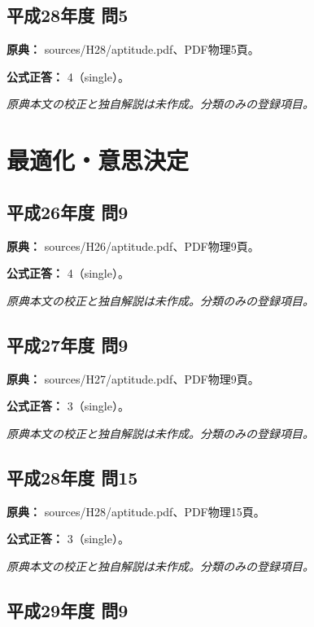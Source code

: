 \subsection{平成28年度 問5}
\label{q:h28-reg-apt-05}

\noindent\textbf{原典：} sources/H28/aptitude.pdf、PDF物理5頁。

\textbf{公式正答：} 4（single）。

\par\textit{原典本文の校正と独自解説は未作成。分類のみの登録項目。}

\section{最適化・意思決定}

\subsection{平成26年度 問9}
\label{q:h26-reg-apt-09}

\noindent\textbf{原典：} sources/H26/aptitude.pdf、PDF物理9頁。

\textbf{公式正答：} 4（single）。

\par\textit{原典本文の校正と独自解説は未作成。分類のみの登録項目。}

\subsection{平成27年度 問9}
\label{q:h27-reg-apt-09}

\noindent\textbf{原典：} sources/H27/aptitude.pdf、PDF物理9頁。

\textbf{公式正答：} 3（single）。

\par\textit{原典本文の校正と独自解説は未作成。分類のみの登録項目。}

\subsection{平成28年度 問15}
\label{q:h28-reg-apt-15}

\noindent\textbf{原典：} sources/H28/aptitude.pdf、PDF物理15頁。

\textbf{公式正答：} 3（single）。

\par\textit{原典本文の校正と独自解説は未作成。分類のみの登録項目。}

\subsection{平成29年度 問9}
\label{q:h29-reg-apt-09}

